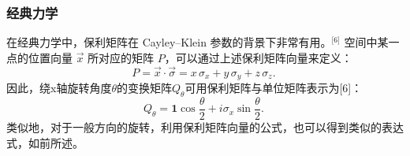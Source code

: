 \subsubsection{经典力学}
在经典力学中，保利矩阵在 Cayley–Klein 参数的背景下非常有用。\(^\text{[6]}\)
空间中某一点的位置向量 $\vec{x}$ 所对应的矩阵 $P$，可以通过上述保利矩阵向量来定义：
$$
P = \vec{x} \cdot \vec{\sigma} = x\,\sigma_x + y\,\sigma_y + z\,\sigma_z.~
$$
因此，绕x轴旋转角度$\theta$的变换矩阵$Q_\theta$可用保利矩阵与单位矩阵表示为[6]：
$$
Q_{\theta} = \mathbf{1} \cos{\frac{\theta}{2}} + i \sigma_x \sin{\frac{\theta}{2}}.~
$$
类似地，对于一般方向的旋转，利用保利矩阵向量的公式，也可以得到类似的表达式，如前所述。
